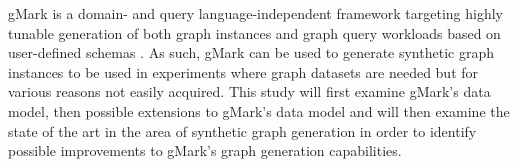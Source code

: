 gMark \cite{Bagan2016GMark:Queries} is a domain- and query language-independent framework targeting highly tunable generation of both graph instances and graph query workloads based on user-defined schemas \cite{BaganG.andBonifatiA.andCiucanuR.andFletcherG.H.L.andLemayA.andAdvokaat2016GMarkProject}. As such, gMark can be used to generate synthetic graph instances to be used in experiments where graph datasets are needed but for various reasons not easily acquired. This study will first examine gMark's data model, then possible extensions to gMark's data model and will then examine the state of the art in the area of synthetic graph generation in order to identify possible improvements to gMark's graph generation capabilities.